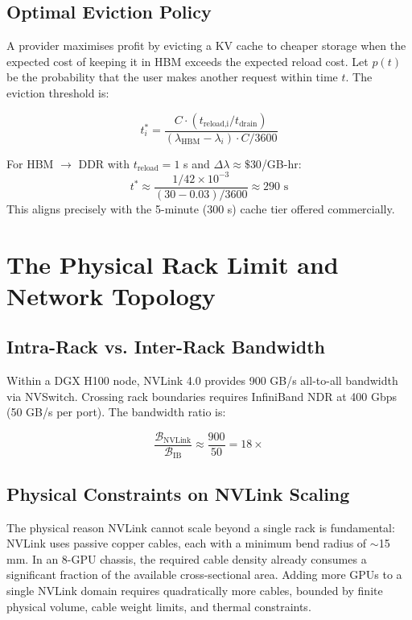 \documentclass[11pt,a4paper]{article}
\newcommand{\BW}{\mathcal{B}}
\begin{document}
\subsection{Optimal Eviction Policy}

A provider maximises profit by evicting a KV cache to cheaper storage when
the expected cost of keeping it in HBM exceeds the expected reload cost.
Let $p(t)$ be the probability that the user makes another request within
time $t$. The eviction threshold is:

\[
  t^*_i = \frac{C \cdot (t_\text{reload,i} / t_\text{drain})}
               {(\lambda_\text{HBM} - \lambda_i) \cdot C / 3600}
\]

For HBM $\to$ DDR with $t_\text{reload} = 1$ s and
$\Delta\lambda \approx \$30$/GB-hr:
\[
  t^* \approx \frac{1/42 \times 10^{-3}}{(30 - 0.03)/3600} \approx 290 \text{ s}
\]
This aligns precisely with the 5-minute (300 s) cache tier offered commercially.

\section{The Physical Rack Limit and Network Topology}
\label{sec:rack}

\subsection{Intra-Rack vs. Inter-Rack Bandwidth}

Within a DGX H100 node, NVLink 4.0 provides 900 GB/s all-to-all bandwidth
via NVSwitch. Crossing rack boundaries requires InfiniBand NDR at 400 Gbps
(50 GB/s per port). The bandwidth ratio is:

\[
  \frac{\BW_\text{NVLink}}{\BW_\text{IB}} \approx \frac{900}{50} = 18\times
\]

\subsection{Physical Constraints on NVLink Scaling}

The physical reason NVLink cannot scale beyond a single rack is fundamental:
NVLink uses passive copper cables, each with a minimum bend radius of
$\sim$15 mm. In an 8-GPU chassis, the required cable density already consumes
a significant fraction of the available cross-sectional area. Adding more
GPUs to a single NVLink domain requires quadratically more cables, bounded
by finite physical volume, cable weight limits, and thermal constraints.
\end{document}
